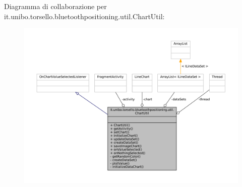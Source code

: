 Diagramma di collaborazione per it.\+unibo.\+torsello.\+bluetoothpositioning.\+util.\+Chart\+Util\+:
\nopagebreak
\begin{figure}[H]
\begin{center}
\leavevmode
\includegraphics[width=350pt]{classit_1_1unibo_1_1torsello_1_1bluetoothpositioning_1_1util_1_1ChartUtil__coll__graph}
\end{center}
\end{figure}

